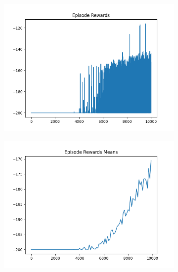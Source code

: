 \begin{figure}[H]
\begin{subfigure}{.47\linewidth}
        \includegraphics[width=\textwidth]{mountain/2024-06-15_12-16-56_dqn_mountaincar_episode_rewards.png}
    \end{subfigure}
    \begin{subfigure}{.47\linewidth}
        \centering
        \includegraphics[width=\textwidth]{mountain/2024-06-15_12-16-56_dqn_mountaincar_episode_rewards_means.png}
    \end{subfigure}
\end{figure}
